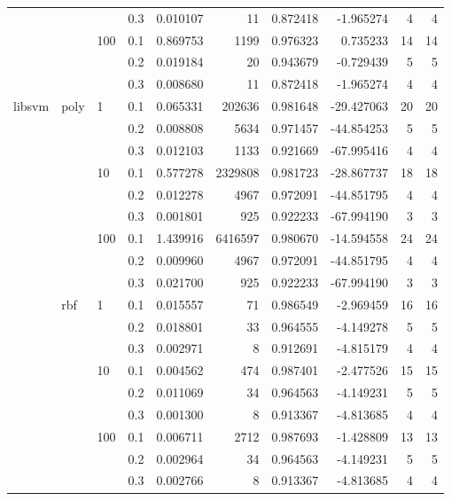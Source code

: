 \begin{table}[h!]
\begin{tabular}{llllrrrrrr}
       &     &     & 0.3 &     0.010107 &       11 &  0.872418 &  -1.965274 &           4 &         4 \\
       &     & 100 & 0.1 &     0.869753 &     1199 &  0.976323 &   0.735233 &          14 &        14 \\
       &     &     & 0.2 &     0.019184 &       20 &  0.943679 &  -0.729439 &           5 &         5 \\
       &     &     & 0.3 &     0.008680 &       11 &  0.872418 &  -1.965274 &           4 &         4 \\
libsvm & poly & 1   & 0.1 &     0.065331 &   202636 &  0.981648 & -29.427063 &          20 &        20 \\
       &     &     & 0.2 &     0.008808 &     5634 &  0.971457 & -44.854253 &           5 &         5 \\
       &     &     & 0.3 &     0.012103 &     1133 &  0.921669 & -67.995416 &           4 &         4 \\
       &     & 10  & 0.1 &     0.577278 &  2329808 &  0.981723 & -28.867737 &          18 &        18 \\
       &     &     & 0.2 &     0.012278 &     4967 &  0.972091 & -44.851795 &           4 &         4 \\
       &     &     & 0.3 &     0.001801 &      925 &  0.922233 & -67.994190 &           3 &         3 \\
       &     & 100 & 0.1 &     1.439916 &  6416597 &  0.980670 & -14.594558 &          24 &        24 \\
       &     &     & 0.2 &     0.009960 &     4967 &  0.972091 & -44.851795 &           4 &         4 \\
       &     &     & 0.3 &     0.021700 &      925 &  0.922233 & -67.994190 &           3 &         3 \\
       & rbf & 1   & 0.1 &     0.015557 &       71 &  0.986549 &  -2.969459 &          16 &        16 \\
       &     &     & 0.2 &     0.018801 &       33 &  0.964555 &  -4.149278 &           5 &         5 \\
       &     &     & 0.3 &     0.002971 &        8 &  0.912691 &  -4.815179 &           4 &         4 \\
       &     & 10  & 0.1 &     0.004562 &      474 &  0.987401 &  -2.477526 &          15 &        15 \\
       &     &     & 0.2 &     0.011069 &       34 &  0.964563 &  -4.149231 &           5 &         5 \\
       &     &     & 0.3 &     0.001300 &        8 &  0.913367 &  -4.813685 &           4 &         4 \\
       &     & 100 & 0.1 &     0.006711 &     2712 &  0.987693 &  -1.428809 &          13 &        13 \\
       &     &     & 0.2 &     0.002964 &       34 &  0.964563 &  -4.149231 &           5 &         5 \\
       &     &     & 0.3 &     0.002766 &        8 &  0.913367 &  -4.813685 &           4 &         4 \\
\bottomrule
\end{tabular}
\end{table}
